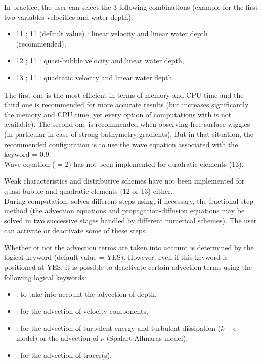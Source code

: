 In practice, the user can select the 3 following combinations
(example for the first two variables velocities and water depth):

\begin{itemize}
\item 11 ; 11 (default value) : linear velocity and linear water depth
(recommended),

\item 12 ; 11 : quasi-bubble velocity and linear water depth,

\item 13 ; 11 : quadratic velocity and linear water depth.
\end{itemize}

The first one is the most efficient in terms of memory and CPU time
and the third one is recommended for more accurate results
(but increases significantly the memory and CPU time,
yet every option of computations with  is not available).
The second one is recommended when observing free surface wiggles
(in particular in case of strong bathymetry gradients).
But in that situation, the recommended configuration is to use the wave equation
associated with the keyword  = 0.9.\\

Wave equation ( = 2) has not been
implemented for quadratic elements (13).

Weak characteristics and distributive schemes have not been implemented
for quasi-bubble and quadratic elements (12 or 13) either.\\

During computation,  solves different steps using, if necessary,
the fractional step method (the advection equations and propagation-diffusion
equations may be solved in two successive stages handled by different numerical
schemes).
The user can activate or deactivate some of these steps.

Whether or not the advection terms are taken into account is determined
by the logical keyword  (default value = YES).
However, even if this keyword is positioned at YES, it is possible
to deactivate certain advection terms using the following logical keywords:

\begin{itemize}
\item {}: to take into account the advection of depth,

\item {}: for the advection of velocity components,

\item {}: for the advection of turbulent energy
and turbulent dissipation ($k-\epsilon$ model)
or the advection of $\tilde{\nu}$ (Spalart-Allmaras model),

\item {}: for the advection of tracer(s).
\end{itemize}


